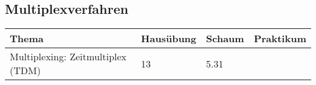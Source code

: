 \subsection{Multiplexverfahren}
	\begin{tabular}{|p{9cm}|p{2.5cm}|p{3.5cm}|p{2cm}|}
	\hline
	\textbf{Thema} & \textbf{Hausübung} & \textbf{Schaum} & \textbf{Praktikum} \\ \hline
	Multiplexing: Zeitmultiplex (TDM) & 13 & 5.31 &  \\ \hline
	\end{tabular}
